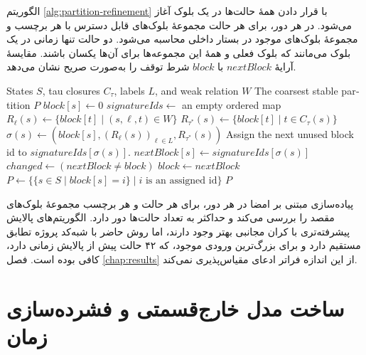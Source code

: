 الگوریتم \ref{alg:partition-refinement} با قرار دادن همهٔ حالت‌ها در یک بلوک آغاز می‌شود. در هر دور، برای هر حالت مجموعهٔ بلوک‌های قابل دسترس با هر برچسب و مجموعهٔ بلوک‌های موجود در بستار داخلی محاسبه می‌شود. دو حالت تنها زمانی در یک بلوک می‌مانند که بلوک فعلی و همهٔ این مجموعه‌ها برای آن‌ها یکسان باشند. مقایسهٔ آرایهٔ $\mathit{nextBlock}$ با $\mathit{block}$ شرط توقف را به‌صورت صریح نشان می‌دهد.

\begin{algorithm}[htbp]
\onehalfspacing
\caption{}
\label{alg:partition-refinement}
\begin{latin}
\begin{algorithmic}[1]
\REQUIRE States $S$, tau closures $C_\tau$, labels $L$, and weak relation $W$
\ENSURE The coarsest stable partition $P$
    \STATE $\mathit{block}[s]\gets 0$
\ENDFOR
\REPEAT
    \STATE $\mathit{signatureIds}\gets$ an empty ordered map
            \STATE $R_\ell(s)\gets\{\mathit{block}[t]\mid(s,\ell,t)\in W\}$
        \ENDFOR
        \STATE $R_{\tau^*}(s)\gets\{\mathit{block}[t]\mid t\in C_\tau(s)\}$
        \STATE $\sigma(s)\gets(\mathit{block}[s],(R_\ell(s))_{\ell\in L},R_{\tau^*}(s))$
            \STATE Assign the next unused block id to $\mathit{signatureIds}[\sigma(s)]$.
        \ENDIF
        \STATE $\mathit{nextBlock}[s]\gets\mathit{signatureIds}[\sigma(s)]$
    \ENDFOR
    \STATE $\mathit{changed}\gets(\mathit{nextBlock}\neq\mathit{block})$
    \STATE $\mathit{block}\gets\mathit{nextBlock}$
\STATE $P\gets\bigl\{\{s\in S\mid\mathit{block}[s]=i\}\mid i\text{ is an assigned id}\bigr\}$
\RETURN $P$
\end{algorithmic}
\end{latin}
\end{algorithm}

پیاده‌سازی مبتنی بر امضا در هر دور، برای هر حالت و هر برچسب مجموعهٔ بلوک‌های مقصد را بررسی می‌کند و حداکثر به تعداد حالت‌ها دور دارد. الگوریتم‌های پالایش پیشرفته‌تری با کران مجانبی بهتر وجود دارند، اما روش حاضر با شبه‌کد پروژه تطابق مستقیم دارد و برای بزرگ‌ترین ورودی موجود، که ۴۲ حالت پیش از پالایش زمانی دارد، کافی بوده است. فصل \ref{chap:results} از این اندازه فراتر ادعای مقیاس‌پذیری نمی‌کند.

\section{ساخت مدل خارج‌قسمتی و فشرده‌سازی زمان}

